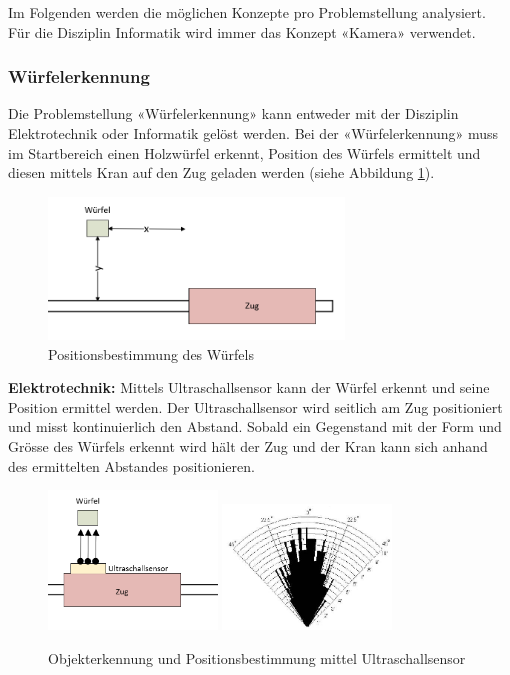 \documentclass[../../main.tex]{subfiles}
\begin{document}
    Im Folgenden werden die möglichen Konzepte pro Problemstellung analysiert. Für die Disziplin Informatik
    wird immer das Konzept «Kamera» verwendet.

    \subsubsection{Würfelerkennung}
    Die Problemstellung «Würfelerkennung» kann entweder mit der Disziplin Elektrotechnik oder Informatik
    gelöst werden. Bei der «Würfelerkennung» muss im Startbereich einen Holzwürfel erkennt,
    Position des Würfels ermittelt und diesen mittels Kran auf den Zug geladen werden 
    (siehe Abbildung \ref{fig:wurfelerkennung}).

    \begin{figure}[H] %
        \centering
        \includegraphics[width=0.7\textwidth]{wurfelerkennung.png}
        \caption{Positionsbestimmung des Würfels}
        \label{fig:wurfelerkennung}
    \end{figure}

    \textbf{Elektrotechnik: }
    Mittels Ultraschallsensor kann der Würfel erkennt und seine Position ermittel werden. Der Ultraschallsensor
    wird seitlich am Zug positioniert und misst kontinuierlich den Abstand. Sobald ein Gegenstand mit der Form und
    Grösse des Würfels erkennt wird hält der Zug und der Kran kann sich anhand des ermittelten Abstandes 
    positionieren.
    \begin{figure}[H] %
        \centering
        \includegraphics[width=0.4\textwidth]{Ultraschallsensor.png}
        \includegraphics[width=0.4\textwidth]{Ultraschallsensor_angle.png}
        \caption{Objekterkennung und Positionsbestimmung mittel Ultraschallsensor}
        \label{fig:wurfel_ultraschall}
    \end{figure}
\end{document}

